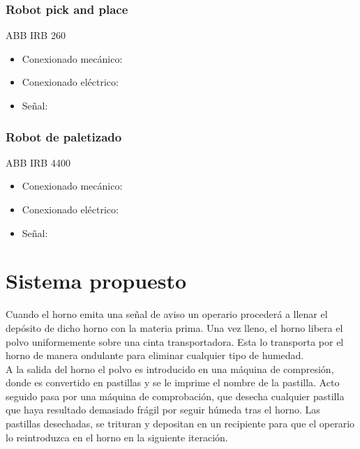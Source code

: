 \subsubsection{Robot pick and place}
	ABB IRB 260
		\begin{itemize}
				\item{Conexionado mecánico:}\\
				
				\item{Conexionado eléctrico:}\\
				
				\item{Señal:}\\
				
		\end{itemize}

	\subsubsection{Robot de paletizado}
	ABB IRB 4400
		\begin{itemize}
				\item{Conexionado mecánico:}\\
				
				\item{Conexionado eléctrico:}\\
				
				\item{Señal:}\\
				
		\end{itemize}


\section{Sistema propuesto}


Cuando el horno emita una señal de aviso un operario procederá a llenar el depósito de dicho horno con la materia prima. Una vez lleno, el horno libera el polvo uniformemente sobre una cinta transportadora. Esta lo transporta por el horno de manera ondulante para eliminar cualquier tipo de humedad. 
\\

A la salida del horno el polvo es introducido en una máquina de compresión, donde es convertido en pastillas y se le imprime el nombre de la pastilla.  Acto seguido pasa por una máquina de comprobación, que desecha cualquier pastilla que haya resultado demasiado frágil por seguir húmeda tras el horno. Las pastillas desechadas, se trituran y depositan en un recipiente para que el operario lo reintroduzca en el horno en la siguiente iteración. 
\\


